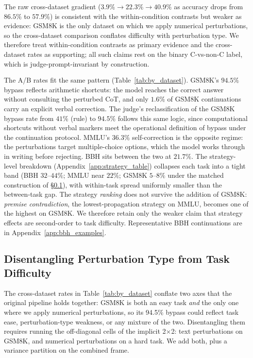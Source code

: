 \documentclass[10pt]{article} %
\begin{document}
The raw cross-dataset gradient ($3.9\% \to 22.3\% \to 40.9\%$ as accuracy drops from $86.5\%$ to $57.9\%$) is consistent with the within-condition contrasts but weaker as evidence: GSM8K is the only dataset on which we apply numerical perturbations, so the cross-dataset comparison conflates difficulty with perturbation type. We therefore treat within-condition contrasts as primary evidence and the cross-dataset rates as supporting; all such claims rest on the binary C-vs-non-C label, which is judge-prompt-invariant by construction.

The A/B rates fit the same pattern (Table~\ref{tab:by_dataset}). GSM8K's $94.5\%$ bypass reflects arithmetic shortcuts: the model reaches the correct answer without consulting the perturbed CoT, and only $1.6\%$ of GSM8K continuations carry an explicit verbal correction. The judge's reclassification of the GSM8K bypass rate from $41\%$ (rule) to $94.5\%$ follows this same logic, since computational shortcuts without verbal markers meet the operational definition of bypass under the continuation protocol. MMLU's $36.3\%$ self-correction is the opposite regime: the perturbations target multiple-choice options, which the model works through in writing before rejecting. BBH sits between the two at $21.7\%$. The strategy-level breakdown (Appendix~\ref{app:strategy_table}) collapses each task into a tight band (BBH $32$--$44\%$; MMLU near $22\%$; GSM8K $5$--$8\%$ under the matched construction of \S\ref{sec:behavioral_confound}), with within-task spread uniformly smaller than the between-task gap. The strategy \emph{ranking} does not survive the addition of GSM8K: \emph{premise contradiction}, the lowest-propagation strategy on MMLU, becomes one of the highest on GSM8K. We therefore retain only the weaker claim that strategy effects are second-order to task difficulty. Representative BBH continuations are in Appendix~\ref{app:bbh_examples}.

\subsection{Disentangling Perturbation Type from Task Difficulty}
\label{sec:behavioral_confound}

The cross-dataset rates in Table~\ref{tab:by_dataset} conflate two axes that the original pipeline holds together: GSM8K is both an easy task \emph{and} the only one where we apply numerical perturbations, so its 94.5\% bypass could reflect task ease, perturbation-type weakness, or any mixture of the two. Disentangling them requires running the off-diagonal cells of the implicit 2$\times$2: text perturbations on GSM8K, and numerical perturbations on a hard task. We add both, plus a variance partition on the combined frame.
\end{document}
